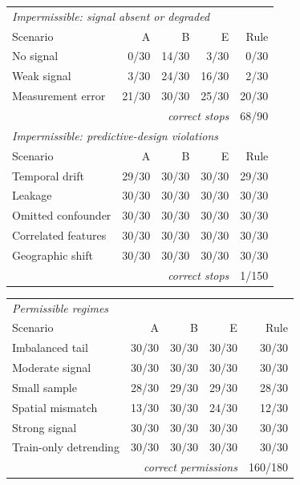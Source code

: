 \begin{minipage}[t]{0.55\textwidth}
\centering
\begin{tabular}{@{}lrrrr@{}}
\toprule
\multicolumn{5}{l}{\textit{Impermissible: signal absent or degraded}} \\
Scenario & A & B & E & Rule \\
\midrule
No signal & 0/30 & 14/30 & 3/30 & 0/30 \\
Weak signal & 3/30 & 24/30 & 16/30 & 2/30 \\
Measurement error & 21/30 & 30/30 & 25/30 & 20/30 \\
\multicolumn{4}{r}{\textit{correct stops}} & 68/90 \\
\multicolumn{5}{l}{\textit{Impermissible: predictive-design violations}} \\
Scenario & A & B & E & Rule \\
\midrule
Temporal drift & 29/30 & 30/30 & 30/30 & 29/30 \\
Leakage & 30/30 & 30/30 & 30/30 & 30/30 \\
Omitted confounder & 30/30 & 30/30 & 30/30 & 30/30 \\
Correlated features & 30/30 & 30/30 & 30/30 & 30/30 \\
Geographic shift & 30/30 & 30/30 & 30/30 & 30/30 \\
\multicolumn{4}{r}{\textit{correct stops}} & 1/150 \\
\bottomrule
\end{tabular}
\end{minipage}\hfill
\begin{minipage}[t]{0.42\textwidth}
\centering
\begin{tabular}{@{}lrrrr@{}}
\toprule
\multicolumn{5}{l}{\textit{Permissible regimes}} \\
Scenario & A & B & E & Rule \\
\midrule
Imbalanced tail & 30/30 & 30/30 & 30/30 & 30/30 \\
Moderate signal & 30/30 & 30/30 & 30/30 & 30/30 \\
Small sample & 28/30 & 29/30 & 29/30 & 28/30 \\
Spatial mismatch & 13/30 & 30/30 & 24/30 & 12/30 \\
Strong signal & 30/30 & 30/30 & 30/30 & 30/30 \\
Train-only detrending & 30/30 & 30/30 & 30/30 & 30/30 \\
\multicolumn{4}{r}{\textit{correct permissions}} & 160/180 \\
\bottomrule
\end{tabular}
\end{minipage}
